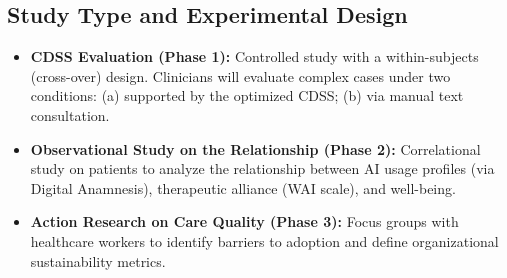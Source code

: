\documentclass[11pt,a4paper]{article}
\begin{document}
\subsection{Study Type and Experimental Design}
\begin{itemize}
    \item \textbf{CDSS Evaluation (Phase 1):} Controlled study with a within-subjects (cross-over) design. Clinicians will evaluate complex cases under two conditions: (a) supported by the optimized CDSS; (b) via manual text consultation.
    \item \textbf{Observational Study on the Relationship (Phase 2):} Correlational study on patients to analyze the relationship between AI usage profiles (via Digital Anamnesis), therapeutic alliance (WAI scale), and well-being.
    \item \textbf{Action Research on Care Quality (Phase 3):} Focus groups with healthcare workers to identify barriers to adoption and define organizational sustainability metrics.
\end{itemize}
\end{document}
